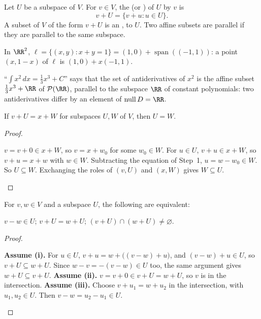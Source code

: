 \documentclass[10pt]{scrartcl}
\DeclareMathOperator{\spn}{span}\DeclareMathOperator{\nul}{null}\DeclareMathOperator{\range}{range}
\newcommand{\PP}{\mathcal P}\newcommand{\LL}{\mathcal L}\newcommand{\MM}{\mathcal M}
\begin{document}
\begin{definition*}
  Let $U$ be a subspace of $V$. For $v\in V$, the  (or ) of $U$ by $v$ is
  \[
    v + U = \{v + u : u\in U\}.
  \]
  A subset of $V$ of the form $v+U$ is an ,  to $U$. Two affine subsets are parallel if they are parallel to the same subspace.
\end{definition*}

\begin{example*}
  In $\RR^2$, $\ell=\{(x,y):x+y=1\}=(1,0)+\spn((-1,1))$: a point $(x,1-x)$ of $\ell$ is $(1,0)+x(-1,1)$.
\end{example*}

\begin{example*}
  ``$\int x^2\,dx=\tfrac13x^3+C$'' says that the set of antiderivatives of $x^2$ is the affine subset $\tfrac13x^3+\RR$ of $\PP(\RR)$, parallel to the subspace $\RR$ of constant polynomials: two antiderivatives differ by an element of $\nul D=\RR$.
\end{example*}

\begin{proposition*}
  If $v+U=x+W$ for subspaces $U,W$ of $V$, then $U=W$.
\end{proposition*}
\begin{proof}
  \begin{steps}
    \ii $v=v+0\in x+W$, so $v=x+w_0$ for some $w_0\in W$.
    \ii For $u\in U$, $v+u\in x+W$, so $v+u=x+w$ with $w\in W$. Subtracting the equation of Step~1, $u=w-w_0\in W$. So $U\subseteq W$.
    \ii Exchanging the roles of $(v,U)$ and $(x,W)$ gives $W\subseteq U$.
  \end{steps}
\end{proof}

\begin{proposition*}
  For $v,w\in V$ and a subspace $U$, the following are equivalent:
  \begin{enumerate}[(i)]
    \ii $v - w \in U$;
    \ii $v + U = w + U$;
    \ii $(v+U)\cap(w+U) \ne \varnothing$.
  \end{enumerate}
\end{proposition*}
\begin{proof}
  \begin{steps}
    \ii \textbf{Assume (i).} For $u\in U$, $v+u=w+\bigl((v-w)+u\bigr)$, and $(v-w)+u\in U$, so $v+U\subseteq w+U$. Since $w-v=-(v-w)\in U$ too, the same argument gives $w+U\subseteq v+U$.
    \ii \textbf{Assume (ii).} $v=v+0\in v+U=w+U$, so $v$ is in the intersection.
    \ii \textbf{Assume (iii).} Choose $v+u_1=w+u_2$ in the intersection, with $u_1,u_2\in U$. Then $v-w=u_2-u_1\in U$.
  \end{steps}
\end{proof}
\end{document}
